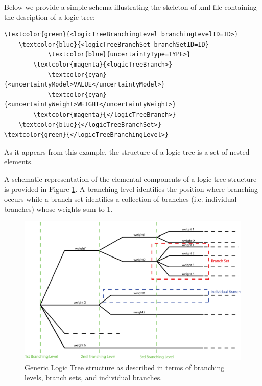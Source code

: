 Below we provide a simple schema illustrating the skeleton of xml file 
containing the desciption of a logic tree:
\begin{Verbatim}[frame=single, commandchars=\\\{\}, fontsize=\small]
\textcolor{green}{<logicTreeBranchingLevel branchingLevelID=ID>}
    \textcolor{blue}{<logicTreeBranchSet branchSetID=ID}
            \textcolor{blue}{uncertaintyType=TYPE>}
        \textcolor{magenta}{<logicTreeBranch>}
            \textcolor{cyan}{<uncertaintyModel>VALUE</uncertaintyModel>}
            \textcolor{cyan}{<uncertaintyWeight>WEIGHT</uncertaintyWeight>}
        \textcolor{magenta}{</logicTreeBranch>}
    \textcolor{blue}{</logicTreeBranchSet>}
\textcolor{green}{</logicTreeBranchingLevel>}
\end{Verbatim}
As it appears from this example, the structure of a logic 
tree is a set of nested elements.

A schematic representation of the elemental components of a logic tree 
structure is provided in Figure \ref{glts}. 
A branching level identifies the position where branching occurs while 
a branch set identifies a collection of branches (i.e. individual branches) 
whose weights sum to 1.
%
\begin{figure}[!h]
\centering
\includegraphics[width=15cm]{./figures/hazard/GenericLogicTreeStructure.eps}
\caption{Generic Logic Tree structure as described in terms of branching 
levels, branch sets, and individual branches.}
\label{glts}
\end{figure}

